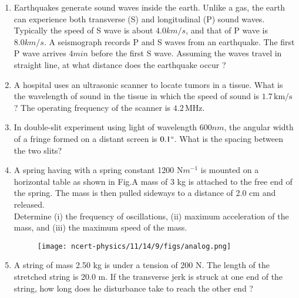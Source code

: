 \begin{enumerate}[label=\thesection.\arabic*,ref=\thesection.\theenumi]
\item
Earthquakes generate sound waves inside the earth. Unlike a gas, the earth can experience both transverse (S) and longitudinal (P) sound waves. Typically the speed of S wave is about $4.0 km/s$, and that of P wave is $8.0 km/s$. A seismograph records P and S waves from an earthquake. The first P wave arrives $4 min$ before the first S wave. Assuming the waves travel in straight line, at what distance does the
earthquake occur ?
\solution
\pagebreak

\item
A hospital uses an ultrasonic scanner to locate tumors in a tissue. What is the wavelength of sound in the tissue in which the speed of sound is $1.7 \, \text{km/s}$? The operating frequency of the scanner is $4.2 \, \text{MHz}$.
\solution
\pagebreak

\item In double-slit experiment using light of wavelength $600 nm$, the
angular width of a fringe formed on a distant screen is $0.1\degree$. What is
the spacing between the two slits?\\
\solution
\pagebreak

\item A spring having with a spring constant 1200 N$m^{-1}$ is mounted on a horizontal
table as shown in Fig.A mass of 3 kg is attached to the free end of the
spring. The mass is then pulled sideways to a distance of 2.0 cm and released.\\
Determine (i) the frequency of oscillations, (ii) maximum acceleration of the mass,
and (iii) the maximum speed of the mass.
\begin{figure}[h!]
    \centering
    \texttt{[image: ncert-physics/11/14/9/figs/analog.png]}
    \caption{ }

\end{figure}
\solution
\pagebreak


\item A string of mass 2.50 kg is under a tension of 200 N. The length of the stretched string is 20.0 m. If the transverse jerk is struck at one end of the string, how long does he disturbance take to reach the other end ? 
\solution
\pagebreak


\end{enumerate}
